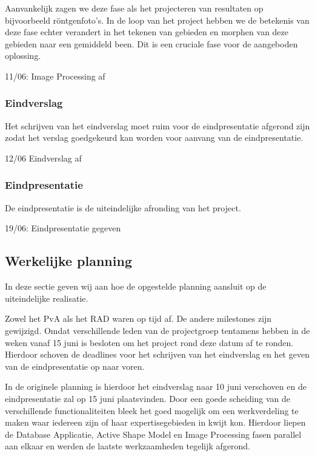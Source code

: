 Aanvankelijk zagen we deze fase als het projecteren van resultaten op
bijvoorbeeld r\"{o}ntgenfoto's. In de loop van het project hebben we de
betekenis van deze fase echter verandert in het tekenen van gebieden en
morphen van deze gebieden naar een gemiddeld been. Dit is een cruciale fase
voor de aangeboden oplossing.

11/06: Image Processing af

\subsubsection{Eindverslag}

Het schrijven van het eindverslag moet ruim voor de eindpresentatie afgerond
zijn zodat het verslag goedgekeurd kan worden voor aanvang van de eindpresentatie.

12/06 Eindverslag af

\subsubsection{Eindpresentatie}

De eindpresentatie is de uiteindelijke afronding van het project.

19/06: Eindpresentatie gegeven

\subsection{Werkelijke planning}
\label{werkelijke_planning}

In deze sectie geven wij aan hoe de opgestelde planning aansluit op de
uiteindelijke realisatie.

Zowel het PvA als het RAD waren op tijd af. De andere milestones zijn
gewijzigd. Omdat verschillende leden van de projectgroep tentamens
hebben in de weken vanaf 15 juni is besloten om het project rond deze datum af
te ronden. Hierdoor schoven de deadlines voor het schrijven van het eindverslag
en het geven van de eindpresentatie op naar voren.

In de originele planning is hierdoor het eindverslag naar 10 juni verschoven en de eindpresentatie zal op 15 juni plaatsvinden.  Door een goede scheiding van de
verschillende functionaliteiten bleek het goed mogelijk om een werkverdeling te
maken waar iedereen zijn of haar expertisegebieden in kwijt kon. Hierdoor
liepen de Database Applicatie, Active Shape Model en Image Processing fasen
parallel aan elkaar en werden de laatste werkzaamheden tegelijk afgerond.

